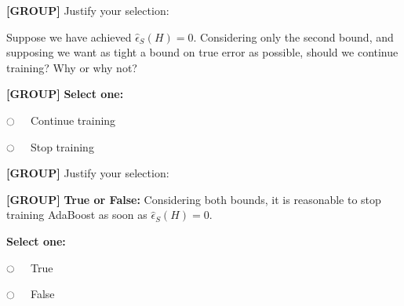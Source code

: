 \documentclass[11pt,addpoints,answers]{exam}
\newcommand{\emptycircle}{{\LARGE $\fullmoon$}\ \ }
\newcommand{\filledcircle}{{\LARGE $\newmoon$}\ \ }
\newcommand{\group}{\textbf{[GROUP]} }
\newcommand{\sone}{\textbf{Select one: }}
\newcommand{\tf}{\textbf{True or False: }}
\newcommand{\trainerr}[1]{\hat{\epsilon}_S \left(#1\right)}
\begin{document}
\begin{questions}
\begin{parts}
\begin{subparts}
\begin{subsubparts}
\begin{list}{}
    \end{list}
    
    
    \subsubpart[1] \group Justify your selection:
    
    \begin{your_solution}[title=Justification,height=3cm, width=.85\textwidth]
    \end{your_solution}
    

\end{subsubparts}





\subpart Suppose we have achieved $\trainerr{H} = 0$. Considering only the second bound, and supposing we want as tight a bound on true error as possible, should we continue training? Why or why not?

\begin{subsubparts}
    \subsubpart[1] \group
    \sone
    \begin{list}{}
        \item 
            \emptycircle 
            Continue training
        \item 
            \emptycircle 
            Stop training
    
    \end{list}
    
    
    \subsubpart[1] \group Justify your selection:
    
    \begin{your_solution}[title=Justification,height=3cm, width=.85\textwidth]
    \end{your_solution}



\end{subsubparts}


\subpart[1] \group \tf Considering both bounds, it is reasonable to stop training AdaBoost as soon as $\trainerr{H} = 0$.

    \sone
    \begin{list}{}
        \item 
            \emptycircle 
            True
        \item 
            \emptycircle 
            False
    

\end{list}
\end{subparts}
\end{parts}
\end{questions}
\end{document}
